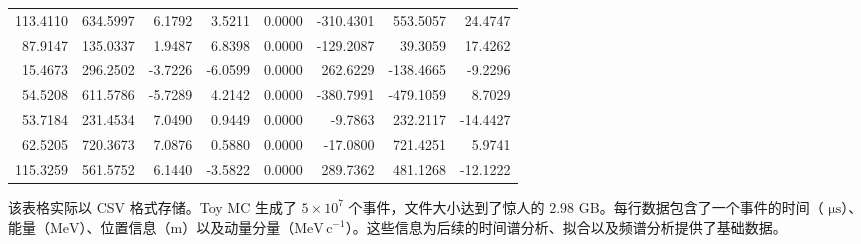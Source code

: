 \documentclass[a4paper,11pt,AutoFakeBold]{ctexart}
\begin{document}
\begin{table}[htbp]
\begin{tabular}{rrrrrrrr}
113.4110 & 634.5997 & 6.1792 & 3.5211 & 0.0000 & -310.4301 & 553.5057 & 24.4747 \\
87.9147 & 135.0337 & 1.9487 & 6.8398 & 0.0000 & -129.2087 & 39.3059 & 17.4262 \\
15.4673 & 296.2502 & -3.7226 & -6.0599 & 0.0000 & 262.6229 & -138.4665 & -9.2296 \\
54.5208 & 611.5786 & -5.7289 & 4.2142 & 0.0000 & -380.7991 & -479.1059 & 8.7029 \\
53.7184 & 231.4534 & 7.0490 & 0.9449 & 0.0000 & -9.7863 & 232.2117 & -14.4427 \\
62.5205 & 720.3673 & 7.0876 & 0.5880 & 0.0000 & -17.0800 & 721.4251 & 5.9741 \\
115.3259 & 561.5752 & 6.1440 & -3.5822 & 0.0000 & 289.7362 & 481.1268 & -12.1222 \\
\hline
\hline
\end{tabular}
\end{table}
该表格实际以 CSV 格式存储。Toy MC 生成了 $5\times 10^7$ 个事件，文件大小达到了惊人的 $2.98$ GB。每行数据包含了一个事件的时间（ $\mathrm{\mu s}$）、能量（$\mathrm{MeV}$）、位置信息（$\mathrm{m}$）以及动量分量（$\mathrm{MeV\,c^{-1}}$）。这些信息为后续的时间谱分析、拟合以及频谱分析提供了基础数据。

\newpage
\printbibliography[heading=bibliography,title=参考文献]
\end{document}
